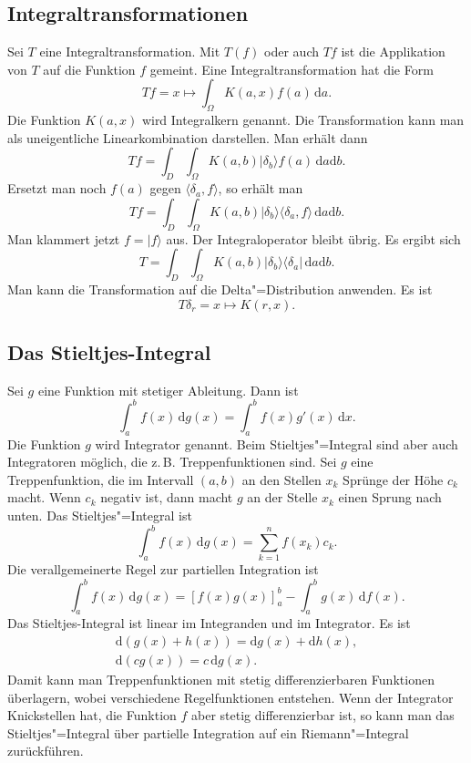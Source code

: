 \documentclass[a4paper,10pt,fleqn,twocolumn,twoside]{article}
\begin{document}
\subsection{Integraltransformationen}

Sei $T$ eine Integraltransformation. Mit $T(f)$ oder auch
$Tf$ ist die Applikation von $T$ auf die Funktion $f$ gemeint.
Eine Integraltransformation hat die Form
\[Tf = x\mapsto \int_{\Omega} K(a,x)f(a)\,\mathrm da.\]
%
Die Funktion $K(a,x)$ wird Integralkern genannt. Die Transformation
kann man als uneigentliche Linearkombination darstellen.
Man erhält dann
\[Tf = \int_{D}\int_{\Omega} K(a,b)
|\delta_b\rangle f(a)\,\mathrm da\mathrm db.\]
%
Ersetzt man noch $f(a)$ gegen $\langle\delta_a,f\rangle$,
so erhält man
\[Tf = \int_{D}\int_{\Omega} K(a,b)
|\delta_b\rangle\langle\delta_a,f\rangle\,\mathrm da\mathrm db.\]
%
Man klammert jetzt $f=|f\rangle$ aus. Der Integraloperator bleibt
übrig. Es ergibt sich
\[T = \int_{D}\int_{\Omega} K(a,b)
|\delta_b\rangle\langle\delta_a|\,\mathrm da\mathrm db.\]
%
Man kann die Transformation auf die Delta"=Distribution anwenden.
Es ist
\[T\delta_r = x\mapsto K(r,x).\]

\subsection{Das Stieltjes-Integral}

Sei $g$ eine Funktion mit stetiger Ableitung. Dann ist
\[\int_a^b f(x)\,\mathrm dg(x) = \int_a^b f(x)g'(x)\,\mathrm dx.\]
Die Funktion $g$ wird Integrator genannt. Beim Stieltjes"=Integral
sind aber auch Integratoren möglich, die z.\,B. Treppenfunktionen sind.
Sei $g$ eine Treppenfunktion, die im Intervall $(a,b)$ an den
Stellen $x_k$ Sprünge der Höhe $c_k$ macht. Wenn $c_k$ negativ
ist, dann macht $g$ an der Stelle $x_k$ einen Sprung nach unten.
Das Stieltjes"=Integral ist
\[\int_a^b f(x)\,\mathrm dg(x) = \sum_{k=1}^n f(x_k)c_k.\]
Die verallgemeinerte Regel zur partiellen Integration ist
\[\int_a^b f(x)\,\mathrm dg(x) = [f(x)g(x)]_a^b - \int_a^b g(x)\,\mathrm df(x).\]
Das Stieltjes-Integral ist linear im Integranden und im Integrator. Es ist
\begin{gather*}
\mathrm d(g(x)+h(x)) = \mathrm dg(x)+\mathrm dh(x),\\
\mathrm d(cg(x)) = c\,\mathrm dg(x).
\end{gather*}
Damit kann man Treppenfunktionen mit stetig differenzierbaren
Funktionen überlagern, wobei verschiedene Regelfunktionen entstehen.
Wenn der Integrator Knickstellen hat, die Funktion $f$ aber stetig
differenzierbar ist, so kann man das Stieltjes"=Integral über
partielle Integration auf ein Riemann"=Integral zurückführen.
\end{document}

